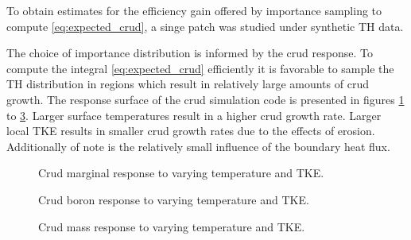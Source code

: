 To obtain estimates for the efficiency gain offered by importance sampling to compute \ref{eq:expected_crud}, a singe patch was studied under synthetic TH data.

The choice of importance distribution is informed by the crud response.  To compute the integral \ref{eq:expected_crud} efficiently it is favorable to sample the TH distribution in regions which result in relatively large amounts of crud growth.  The response surface of the crud simulation code is presented in figures \ref{fig:crud_sensi1} to \ref{fig:crud_sensi3}.  Larger surface temperatures result in a higher crud growth rate.  Larger local TKE results in smaller crud growth rates due to the effects of erosion.  Additionally of note is the relatively small influence of the boundary heat flux.

\begin{figure}[H]%
    \centering
    \qquad
    \caption[]{Crud marginal response to varying temperature and TKE.}%
    \label{fig:crud_sensi1}%
\end{figure}

\begin{figure}[H]%
    \centering
    \qquad
    \caption[]{Crud boron response to varying temperature and TKE.}%
    \label{fig:crud_sensi2}%
\end{figure}

\begin{figure}[H]%
    \centering
    \qquad
    \caption[]{Crud mass response to varying temperature and TKE.}%
    \label{fig:crud_sensi3}%
\end{figure}


